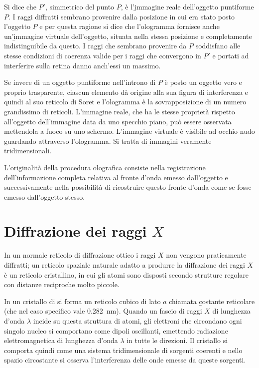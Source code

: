 Si dice che $P'$, simmetrico del punto $P$, è l'\b{immagine reale} dell'oggetto puntiforme $P$. I raggi diffratti sembrano provenire dalla posizione in cui era stato posto l'oggetto $P$ e per questa ragione si dice che l'ologramma fornisce anche un'\b{immagine virtuale} dell'oggetto, situata nella stessa posizione e completamente indistinguibile da questo. I raggi che sembrano provenire da $P$ soddisfano alle stesse condizioni di coerenza valide per i raggi che convergono in $P'$ e portati ad interferire sulla retina danno anch'essi un massimo.

Se invece di un oggetto puntiforme nell'introno di $P$ è posto un oggetto vero e proprio trasparente, ciascun elemento dà origine alla sua figura di interferenza e quindi al suo reticolo di Soret e l'ologramma è la sovrapposizione di un numero grandissimo di reticoli. L'immagine reale, che ha le stesse proprietà rispetto all'oggetto dell'immagine data da uno specchio piano, può essere osservata mettendola a fuoco su uno schermo. L'immagine virtuale è visibile ad occhio nudo guardando attraverso l'ologramma. Si tratta di \b{immagini veramente tridimensionali}.

L'originalità della procedura olografica consiste nella registrazione dell'informazione completa relativa al fronte d'onda emesso dall'oggetto e successivamente nella possibilità di ricostruire questo fronte d'onda come se fosse emesso dall'oggetto stesso.

\section{Diffrazione dei raggi $X$}%
In un normale reticolo di diffrazione ottico i raggi $X$ non vengono praticamente diffratti; un reticolo spaziale naturale adatto a produrre la diffrazione dei raggi $X$ è un reticolo cristallino, in cui gli atomi sono disposti secondo strutture regolare con distanze reciproche molto piccole.

In un cristallo di  si forma un reticolo cubico di lato $a$ chiamata \b{costante reticolare} (che nel caso specifico vale \SI{0.282}{nm}). Quando un fascio di raggi $X$ di lunghezza d'onda $\lambda$ incide su questa struttura di atomi, gli elettroni che circondano ogni singolo nucleo si comportano come dipoli oscillanti, emettendo radiazione elettromagnetica di lunghezza d'onda $\lambda$ in tutte le direzioni. Il cristallo si comporta quindi come una sistema tridimensionale di sorgenti coerenti e nello spazio circostante si osserva l'interferenza delle onde emesse da queste sorgenti.

